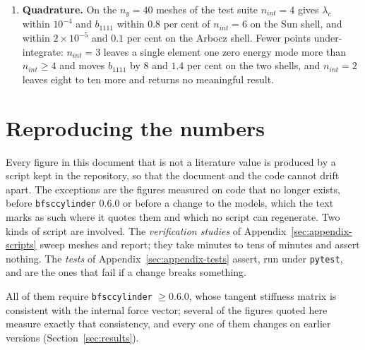 \documentclass[11pt,a4paper]{article}
\begin{document}
\begin{enumerate}
        reaches the requested neighbourhood of the bifurcation point on all
        meshes tried, but it remains load controlled.  The extrapolated
        eigenvalue problem of Sun~Eq.~(27),
        $\left[\boldsymbol{K}_T + (\lambda_c-\lambda_b)\,
        \partial\boldsymbol{K}_T/\partial\lambda\right]
        \delta\boldsymbol{\bar{u}}=\boldsymbol{0}$, would remove the need to
        sit on top of the bifurcation point at all.
  \item \textbf{Quadrature.}  On the $n_y = 40$ meshes of the test suite
        $n_{int}=4$ gives $\lambda_c$ within $10^{-4}$ and $b_{1111}$ within
        $0.8$ per cent of $n_{int}=6$ on the Sun shell, and within
        $2\times10^{-5}$ and $0.1$ per cent on the Arbocz shell.  Fewer
        points under-integrate: $n_{int}=3$ leaves a single element one zero
        energy mode more than $n_{int}\geq4$ and moves $b_{1111}$ by $8$ and
        $1.4$ per cent on the two shells, and $n_{int}=2$ leaves eight to ten
        more and returns no meaningful result.
\end{enumerate}

\appendix
\section{Reproducing the numbers}
\label{sec:appendix}

Every figure in this document that is not a literature value is produced by a
script kept in the repository, so that the document and the code cannot drift
apart.  The exceptions are the figures measured on code that no longer exists,
before \texttt{bfsccylinder} 0.6.0 or before a change to the models, which the
text marks as such where it quotes them and which no script can regenerate.
Two kinds of script are involved.  The \emph{verification studies} of
Appendix~\ref{sec:appendix-scripts} sweep meshes and report; they take minutes
to tens of minutes and assert nothing.  The \emph{tests} of
Appendix~\ref{sec:appendix-tests} assert, run under \texttt{pytest}, and are
the ones that fail if a change breaks something.

All of them require \texttt{bfsccylinder} $\geq 0.6.0$, whose tangent
stiffness matrix is consistent with the internal force vector; several of the
figures quoted here measure exactly that consistency, and every one of them
changes on earlier versions (Section~\ref{sec:results}).
\end{document}
